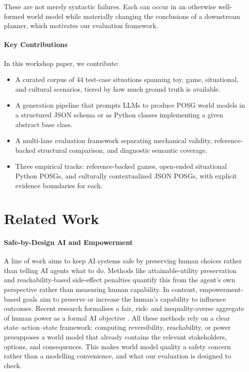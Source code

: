 \documentclass{article}
\begin{document}
These are not merely syntactic failures. Each can occur in an otherwise well-formed world model while materially changing the conclusions of a downstream planner, which motivates our evaluation framework.

\paragraph{Key Contributions}
In this workshop paper, we contribute:
\begin{itemize}
    \item A curated corpus of 44 test-case situations spanning toy, game, situational, and cultural scenarios, tiered by how much ground truth is available.
    \item A generation pipeline that prompts LLMs to produce POSG world models in a structured JSON schema or as Python classes implementing a given abstract base class.
    \item A multi-lane evaluation framework separating mechanical validity, reference-backed structural comparison, and diagnostic semantic coverage.
    \item Three empirical tracks: reference-backed games, open-ended situational Python POSGs, and culturally contextualized JSON POSGs, with explicit evidence boundaries for each.
\end{itemize}


\section{Related Work}
\label{sec:related_work}

\paragraph{Safe-by-Design AI and Empowerment}
A line of work aims to keep AI systems safe by preserving human choices rather than telling AI agents what to do. Methods like attainable-utility preservation \citep{turner2020conservative} and reachability-based side-effect penalties \citep{krakovna2020avoiding} quantify this from the agent's own perspective rather than measuring human capability. In contrast, empowerment-based goals aim to preserve or increase the human's capability to influence outcomes. Recent research formalises a fair, risk- and inequality-averse aggregate of human power as a formal AI objective \citet{heitzigfair}. All these methods rely on a clear state--action--state framework: computing reversibility, reachability, or power presupposes a world model that already contains the relevant stakeholders, options, and consequences. This makes world model quality a safety concern rather than a modelling convenience, and what our evaluation is designed to check.
\end{document}
